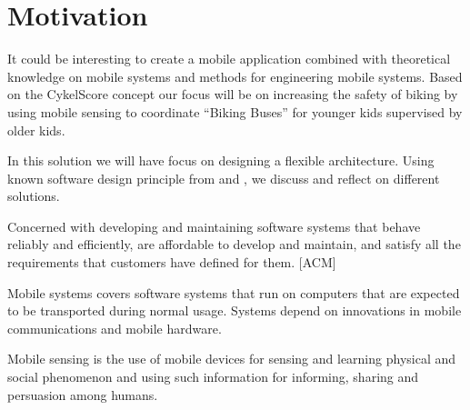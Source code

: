 \section{Motivation} It could be interesting to create a mobile application combined with theoretical knowledge on mobile systems and methods for engineering mobile systems. Based on the CykelScore concept our focus will be on increasing the safety of biking by using mobile sensing to coordinate “Biking Buses” for younger kids supervised by older kids.   

 In this solution we will have focus on designing a flexible architecture. Using known software design principle from \cite{Bass} and \cite{Baerbak10}, we discuss and reflect on different solutions.
 
 
\begin{defi}
Concerned with developing and maintaining software systems that behave reliably and efficiently, are affordable to develop and maintain,
and satisfy all the requirements that customers have defined for them. [ACM]
\end{defi}


\begin{defi}
Mobile systems covers software systems that run on computers that are expected to be transported during normal usage. Systems depend on innovations in mobile
communications and mobile hardware.
\end{defi}


\begin{defi}
Mobile sensing is the use of mobile devices for sensing and learning physical and social phenomenon and using such information for
informing, sharing and persuasion among humans.
\end{defi}



